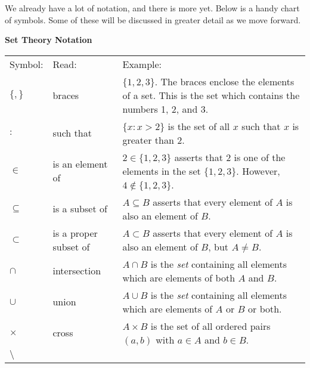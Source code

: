 \documentclass[10pt,]{book}
\theoremstyle{plain}
\theoremstyle{definition}
\theoremstyle{definition}
\theoremstyle{definition}
\newcommand{\hrulethick} {\noalign{\hrule height 0.11em}}
\def\st{:}
\begin{document}
      We already have a lot of notation, and there is more yet. Below is a handy chart of symbols. Some of these will be discussed in greater detail as we move forward.
\begin{mdframed}[style=assemblage]%
\noindent\textbf{\large Set Theory Notation}\label{assemblage-1}\par\medskip

        \begin{tabular}{lll}
Symbol:&Read:&Example:\tabularnewline\hrulethick
\(\{, \}\)

            &braces&\(\{1,2,3\}\). The braces enclose the elements of a set. This is the set which contains the numbers 1, 2, and 3.\tabularnewline[0pt]

              \(\st\)

            &such that&\(\{x \st x > 2\}\) is the set of all \(x\) such that \(x\) is greater than 2.\tabularnewline[0pt]

              \(\in\)

            &is an element of&\(2 \in \{1,2,3\}\) asserts that 2 is one of the elements in the set \(\{1,2,3\}\). However, \(4 \notin\{1,2,3\}\).\tabularnewline[0pt]

              \(\subseteq\)

            &is a subset of&\(A \subseteq B\) asserts that every element of \(A\) is also an element of \(B\).\tabularnewline[0pt]

              \(\subset\)
            &is a proper subset of&\(A \subset B\) asserts that every element of \(A\) is also an element of \(B\), but \(A \ne B\).\tabularnewline[0pt]

              \(\cap\)

            &intersection

            &\(A \cap B\) is the \emph{set} containing all elements which are elements of both \(A\) and \(B\).\tabularnewline[0pt]

              \(\cup\)

            &union

            &\(A \cup B\) is the \emph{set} containing all elements which are elements of \(A\) or \(B\) or both.\tabularnewline[0pt]

              \(\times\)

            &cross&\(A \times B\) is the set of all ordered pairs \((a,b)\) with \(a \in A\) and \(b \in B\).\tabularnewline[0pt]

              \(\setminus\)


\end{tabular}
\end{mdframed}
\end{document}
